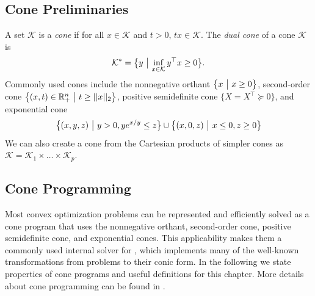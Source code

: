 \subsection{Cone Preliminaries}
A set $\mathcal{K}$ is a \emph{cone}
if for all $x\in\mathcal{K}$ and $t>0$,
$tx\in\mathcal{K}$.
The \emph{dual cone} of a cone $\mathcal{K}$ is
$$\mathcal{K}^* =\big\{{y}~\big |~{\inf_{x\in \mathcal{K}} y^\top x\ge 0}\big\}.$$
Commonly used cones include the
nonnegative orthant $\big\{{x}~\big |~{x\geq 0}\big\}$,
second-order cone $\big\{{(x,t)\in\mathbb{R}^n_+}~\big |~{t\geq ||x||_2}\big\}$,
positive semidefinite cone $\{X=X^\top \succeq 0\}$,
and
exponential cone
\begin{equation}
  \big\{{(x,y,z)}~\big |~{y>0, ye^{x/y} \leq z}\big\} \cup
  \big\{{(x,0,z)}~\big |~{x\leq 0, z\geq 0}\big\}
\end{equation}
We can also create a cone from the Cartesian
products of simpler cones as
$\mathcal{K}=\mathcal{K}_1\times \ldots \times\mathcal{K}_p$.

\subsection{Cone Programming}
Most convex optimization problems can be represented and
efficiently solved as a cone program that uses
the nonnegative orthant, second-order cone,
positive semidefinite cone, and exponential cones.
This applicability makes them a commonly used internal
solver for \cvxpy, which implements many of the
well-known transformations from problems to their
conic form.
In the following we state properties of cone programs
and useful definitions for this chapter.
More details about cone programming can be found in
\citet{boyd2004convex,ben2001lectures,busseti2018solution,odonoghue2016conic,lobo1998applications,alizadeh2003second}.

